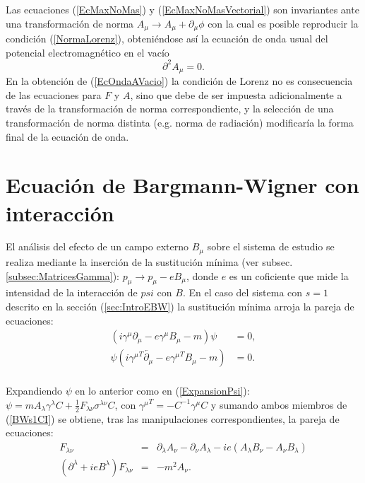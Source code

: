 Las ecuaciones (\ref{EcMaxNoMas}) y (\ref{EcMaxNoMasVectorial}) son invariantes ante una transformación de norma $A_\mu \rightarrow A_\mu+\partial_\mu \phi$ con la cual es posible reproducir la condición (\ref{NormaLorenz}), obteniéndose así la ecuación de onda usual del potencial electromagnético en el vacío
\begin{equation}\label{EcOndaAVacio}
 \partial^2 A_\mu =0.
\end{equation}
En la obtención de (\ref{EcOndaAVacio}) la condición de Lorenz no es consecuencia de las ecuaciones para $F$ y $A$, sino que debe de ser impuesta adicionalmente a través de la transformación de norma correspondiente, y la selección de una transformación de norma distinta (e.g. norma de radiación) modificaría la forma final de la ecuación de onda.\cite{Lurie}

\section{Ecuación de Bargmann-Wigner con interacción}
\label{sec:EBWI}

El análisis del efecto de un campo externo $B_\mu$ sobre el sistema de estudio se realiza mediante la inserción de la sustitución mínima (ver subsec. \ref{subsec:MatricesGamma}): $p_\mu \rightarrow p_\mu - eB_\mu$\footnotemark, donde $e$ es un coficiente que mide la intensidad de la interacción de $psi$ con $B$. En el caso del sistema con $s=1$ descrito en la sección (\ref{sec:IntroEBW}) la sustitución mínima arroja la pareja de ecuaciones:
\begin{equation}\label{BWs1CI}
\begin{array}{rl}
\left(i\gamma^\mu \partial_\mu-e\gamma^\mu B_\mu -m\right)\psi &=0,\\[5pt]
\psi(i{\gamma^\mu}^{T} \overleftarrow{\partial_\mu}-e{\gamma^\mu}^{T} B_\mu -m) &=0.\\
\end{array}
\end{equation}

Expandiendo $\psi$ en lo anterior como en (\ref{ExpansionPsi}): $\psi=mA_\lambda \gamma^\lambda C+\frac{1}{2}F_{\lambda\nu}\sigma^{\lambda \nu}C$, con ${\gamma^\mu}^{T}=-C^{-1}\gamma^\mu C$ y sumando ambos miembros de (\ref{BWs1CI}) se obtiene, tras las manipulaciones correspondientes, la pareja de ecuaciones:
\begin{subequations}\label{EcMaxMasCI}
 \begin{eqnarray}
  F_{\lambda \nu} & = & \partial_\lambda A_\nu - \partial_\nu A_\lambda -ie(A_\lambda B_\nu - A_\nu B_\lambda)\label{EcMaxMasCIA}\\
  (\partial^{\lambda}+ieB^\lambda)F_{\lambda \nu} & = & -m^2 A_\nu. \label{EcMaxMasCIB}
\end{eqnarray}
\end{subequations}

